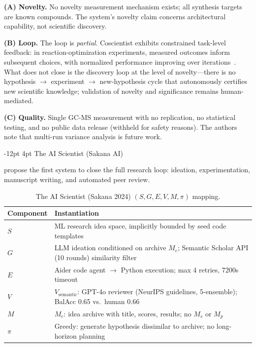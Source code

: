 \documentclass[11pt]{article}
\makeatletter
\renewcommand\subsection{\@startsection{subsection}{2}{\z@}%
  {-12pt \@plus -2pt \@minus -2pt}%
  {4pt \@plus 1pt}%
  {\normalfont\normalsize\bfseries}}
\newcommand{\sgmvpi}{$(S, G, E, V, M, \pi)$}
\makeatother
\begin{document}
\noindent\textbf{(A) Novelty.} No novelty measurement mechanism exists; all synthesis targets are known compounds. The system's novelty claim concerns architectural capability, not scientific discovery.

\noindent\textbf{(B) Loop.} The loop is \emph{partial}. Coscientist exhibits constrained task-level feedback: in reaction-optimization experiments, measured outcomes inform subsequent choices, with normalized performance improving over iterations~\citep{boiko2023emergent}. What does not close is the discovery loop at the level of novelty---there is no hypothesis $\rightarrow$ experiment $\rightarrow$ new-hypothesis cycle that autonomously certifies new scientific knowledge; validation of novelty and significance remains human-mediated.

\noindent\textbf{(C) Quality.} Single GC-MS measurement with no replication, no statistical testing, and no public data release (withheld for safety reasons). The authors note that multi-run variance analysis is future work.

\subsection{The AI Scientist (Sakana AI)}
\label{sec:aisci-sakana}

\citet{lu2024aiscientist} propose the first system to close the full research loop: ideation, experimentation, manuscript writing, and automated peer review.

\begin{table}[h]
\centering
\small
\begin{tabular}{@{}lp{9cm}@{}}
\toprule
Component & Instantiation \\
\midrule
$S$ & ML research idea space, implicitly bounded by seed code templates \\
$G$ & LLM ideation conditioned on archive $M_e$; Semantic Scholar API (10 rounds) similarity filter \\
$E$ & Aider code agent $\rightarrow$ Python execution; max 4 retries, 7200s timeout \\
$V$ & $V_\text{semantic}$: GPT-4o reviewer (NeurIPS guidelines, 5-ensemble); BalAcc 0.65 vs.\ human 0.66 \\
$M$ & $M_e$: idea archive with title, scores, results; no $M_s$ or $M_p$ \\
$\pi$ & Greedy: generate hypothesis dissimilar to archive; no long-horizon planning \\
\bottomrule
\end{tabular}
\caption{The AI Scientist (Sakana 2024) \sgmvpi{} mapping.}
\end{table}
\end{document}
